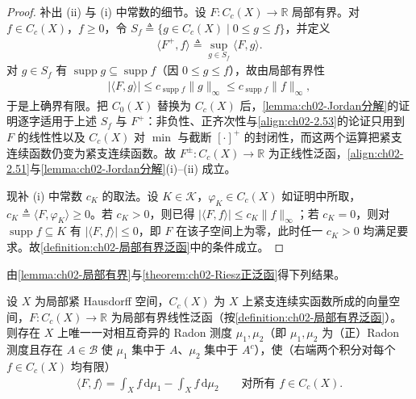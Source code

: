 \documentclass[../../main.tex]{subfiles}%
\begin{document}
\begin{proof}
补出 (ii) 与 (i) 中常数的细节。设 $F:C_c(X)\to\mathbb R$ 局部有界。对 $f\in C_c(X)$，$f\geqslant0$，令 $S_f\triangleq\{g\in C_c(X)\mid 0\leqslant g\leqslant f\}$，并定义
\begin{align*}
\langle F^+,f\rangle\triangleq\sup_{g\in S_f}\langle F,g\rangle.
\end{align*}
对 $g\in S_f$ 有 $\operatorname{supp}g\subseteq\operatorname{supp}f$（因 $0\leqslant g\leqslant f$），故由局部有界性
\begin{align*}
|\langle F,g\rangle|\leqslant c_{\operatorname{supp}f}\|g\|_\infty\leqslant c_{\operatorname{supp}f}\|f\|_\infty,
\end{align*}
于是上确界有限。把 $C_0(X)$ 替换为 $C_c(X)$ 后，\cref{lemma:ch02-Jordan分解}的证明逐字适用于上述 $S_f$ 与 $F^+$：非负性、正齐次性与\eqref{align:ch02-2.53}的论证只用到 $F$ 的线性性以及 $C_c(X)$ 对 $\min$ 与截断 $[\cdot]^+$ 的封闭性，而这两个运算把紧支连续函数仍变为紧支连续函数。故 $F^\pm:C_c(X)\to\mathbb R$ 为正线性泛函，\eqref{align:ch02-2.51}与\cref{lemma:ch02-Jordan分解}(i)--(ii) 成立。

现补 (i) 中常数 $c_K$ 的取法。设 $K\in\mathscr K$，$\varphi_K\in C_c(X)$ 如证明中所取，$c_K\triangleq\langle F,\varphi_K\rangle\geqslant0$。若 $c_K>0$，则已得 $|\langle F,f\rangle|\leqslant c_K\|f\|_\infty$；若 $c_K=0$，则对 $\operatorname{supp}f\subseteq K$ 有 $|\langle F,f\rangle|\leqslant0$，即 $F$ 在该子空间上为零，此时任一 $c_K>0$ 均满足要求。故\cref{definition:ch02-局部有界泛函}中的条件成立。
\end{proof}

由\cref{lemma:ch02-局部有界}与\cref{theorem:ch02-Riesz正泛函}得下列结果。

\begin{theorem}\label{theorem:ch02-RieszCc}
设 $X$ 为局部紧 Hausdorff 空间，$C_c(X)$ 为 $X$ 上紧支连续实函数所成的向量空间，$F:C_c(X)\to\mathbb R$ 为局部有界线性泛函（按\cref{definition:ch02-局部有界泛函}）。则存在 $X$ 上唯一一对相互奇异的 Radon 测度 $\mu_1,\mu_2$（即 $\mu_1,\mu_2$ 为（正）Radon 测度且存在 $A\in\mathscr B$ 使 $\mu_1$ 集中于 $A$、$\mu_2$ 集中于 $A^c$），使（右端两个积分对每个 $f\in C_c(X)$ 均有限）
\begin{align*}
\langle F,f\rangle=\int_X f\,\mathrm{d}\mu_1-\int_X f\,\mathrm{d}\mu_2\qquad\text{对所有 }f\in C_c(X).
\end{align*}
\end{theorem}
\end{document}
